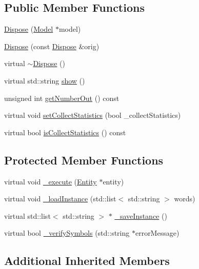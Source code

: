 \subsection*{Public Member Functions}
\begin{DoxyCompactItemize}
\item 
\hyperlink{class_dispose_a9b5ccd61252e7f36d747fd832debdfaa}{Dispose} (\hyperlink{class_model}{Model} $\ast$model)
\item 
\hyperlink{class_dispose_a8d4515962baf1fd7c01912cb654aa683}{Dispose} (const \hyperlink{class_dispose}{Dispose} \&orig)
\item 
virtual \hyperlink{class_dispose_a2a2af23e9cbca66b02a142252a99096d}{$\sim$\+Dispose} ()
\item 
virtual std\+::string \hyperlink{class_dispose_aee8ef98d5ca22eb18a97b258ed059865}{show} ()
\item 
unsigned int \hyperlink{class_dispose_a8c9a1e395263459e5566b44ffe892129}{get\+Number\+Out} () const 
\item 
virtual void \hyperlink{class_dispose_a8dc978664e640bc4d58760770b84b84e}{set\+Collect\+Statistics} (bool \+\_\+collect\+Statistics)
\item 
virtual bool \hyperlink{class_dispose_aff15fbea8737b30efe9b3521d12350bd}{is\+Collect\+Statistics} () const 
\end{DoxyCompactItemize}
\subsection*{Protected Member Functions}
\begin{DoxyCompactItemize}
\item 
virtual void \hyperlink{class_dispose_a342eb428496534cdfd17524ad78b0c08}{\+\_\+execute} (\hyperlink{class_entity}{Entity} $\ast$entity)
\item 
virtual void \hyperlink{class_dispose_a245f73bff07925e3efc1eeffd84c9ac6}{\+\_\+load\+Instance} (std\+::list$<$ std\+::string $>$ words)
\item 
virtual std\+::list$<$ std\+::string $>$ $\ast$ \hyperlink{class_dispose_ae12482052fb78fa534dda5d4c0a74e3e}{\+\_\+save\+Instance} ()
\item 
virtual bool \hyperlink{class_dispose_a5ad64b97bbb16662aa9d914eda2a7e38}{\+\_\+verify\+Symbols} (std\+::string $\ast$error\+Message)
\end{DoxyCompactItemize}
\subsection*{Additional Inherited Members}


